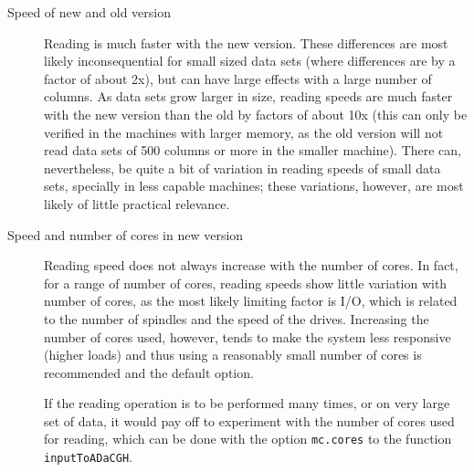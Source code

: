 \documentclass[a4paper,11pt]{article}
\begin{document}
\begin{description}
\item[Speed of new and old version] Reading is much faster with the new
  version. These differences are most likely inconsequential for small
  sized data sets (where differences are by a factor of about 2x), but can
  have large effects with a large number of columns.  As data sets grow
  larger in size, reading speeds are much faster with the new version than
  the old by factors of about 10x (this can only be verified in the
  machines with larger memory, as the old version will not read data sets
  of 500 columns or more in the smaller machine). There can,
  nevertheless, be quite a bit of variation in reading speeds of small
  data sets, specially in less capable machines; these variations,
  however, are most likely of little practical relevance.

  


\item[Speed and number of cores in new version] Reading speed does not
  always increase with the number of cores. In fact, for a range of number
  of cores, reading speeds show little variation with number of cores, as
  the most likely limiting factor is I/O, which is related to the number
  of spindles and the speed of the drives. Increasing the number of cores
  used, however, tends to make the system less responsive (higher loads)
  and thus using a reasonably small number of cores is recommended and the
  default option.



  If the reading operation is to be performed many times, or on very large
  set of data, it would pay off to experiment with the number of cores
  used for reading, which can be done with the option \texttt{mc.cores} to
  the function \texttt{inputToADaCGH}.

\end{description}
\end{document}
